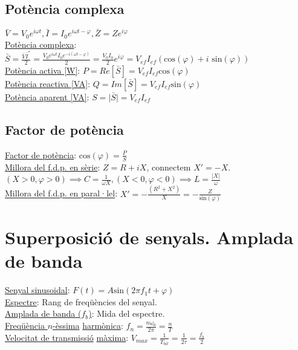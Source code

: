 \documentclass[12pt]{article}
\begin{document}
\begin{multicols}{5}
\subsection{Potència complexa}

$\bar{V} = V_0e^{i\omega t}, \bar{I} = I_0e^{i\omega t - \varphi}, \bar{Z} = Z e^{i\varphi}$ \\
\underline{Potència complexa}: $\bar{S} = \frac{\bar{V}\bar{I}^*}{2} = \frac{V_0e^{i\omega t}I_0e^{-i(\omega t - \varphi)}}{2} = \frac{V_0I_0}{2}e^{i\varphi} = V_{ef}I_{ef}(\text{cos}(\varphi) + i\text{ sin}(\varphi))$ \\
\underline{Potència activa [W]}: $P = Re[\bar{S}] = V_{ef}I_{ef}\text{cos}(\varphi)$ \\
\underline{Potència reactiva [VA]}: $Q = Im[\bar{S}] = V_{ef}I_{ef}\text{sin}(\varphi)$ \\
\underline{Potència aparent [VA]}: $S = \vert \bar{S} \vert = V_{ef}I_{ef}$

\subsection{Factor de potència}

\underline{Factor de potència}: $\text{cos}(\varphi) = \frac{P}{S}$ \\
\underline{Millora del f.d.p. en sèrie}: $Z = R + iX$, connectem $X' = -X$. $(X>0,\varphi>0) \implies C=\frac{1}{\omega X}, (X<0, \varphi<0) \implies L=\frac{\vert X\vert}{\omega}$ \\
\underline{Millora del f.d.p. en paral·lel}: $X' = -\frac{(R^2+X^2)}{X} = -\frac{Z}{\text{sin}(\varphi)}$

\section{Superposició de senyals. Amplada de banda}

\underline{Senyal sinusoidal}: $F(t) = A\text{sin}(2\pi f_1t+ \varphi)$ \\
\underline{Espectre}: Rang de freqüències del senyal. \\
\underline{Amplada de banda ($f_b$)}: Mida del espectre. \\
\underline{Freqüència $n$-èssima} \underline{harmònica}: $f_n = \frac{n\omega_0}{2\pi} = \frac{n}{T}$ \\
\underline{Velocitat de transmissió} \underline{màxima}: $V_{max} = \frac{1}{T_{bit}} = \frac{1}{2\tau} = \frac{f_b}{2}$ \\

\end{multicols}
\end{document}
